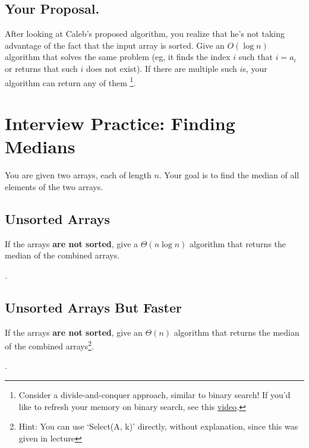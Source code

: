 \documentclass [12pt]{article}
\begin{document}
\subsection{Your Proposal. }
\label{subsec:second_proposal}
After looking at Caleb's proposed algorithm, you realize that he's not taking advantage of the fact that the input array is sorted. Give an $O(\log n)$ algorithm that solves the same problem (eg, it finds the index $i$ such that $i = a_i$ or returns that such $i$ does not exist). If there are multiple such $i$s, your algorithm can return any of them \footnote{Consider a divide-and-conquer approach, similar to binary search! If you'd like to refresh your memory on binary search, see this \href{https://www.youtube.com/watch?v=P3YID7liBug}{video}.}.



\pagebreak
\section{Interview Practice: Finding Medians }
You are given two arrays, each of length $n$. Your goal is to find the median of all elements of the two arrays.


\subsection{Unsorted Arrays }
If the arrays \textbf{are not sorted}, give a $\Theta(n \log n)$ algorithm that returns the median of the combined arrays.

.


\subsection{Unsorted Arrays But Faster } 

If the arrays \textbf{are not sorted}, give an $\Theta(n)$ algorithm that returns the median of the combined arrays\footnote{Hint: You can use `Select(A, k)' directly, without explanation, since this was given in lecture}.

.
\end{document}
